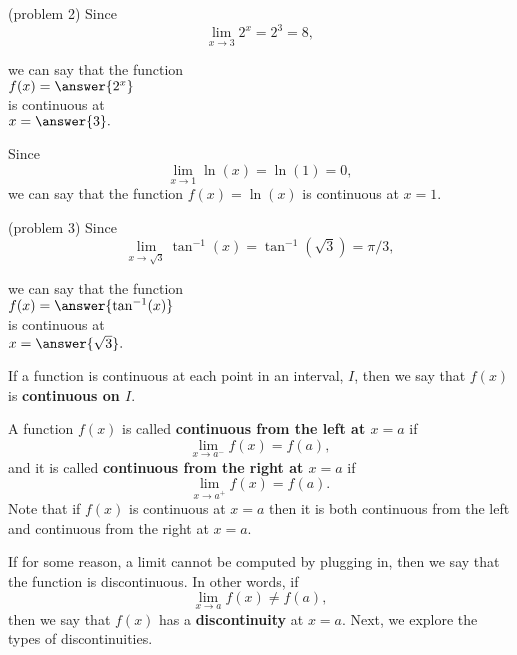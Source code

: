 \documentclass{ximera}
\begin{document}
\begin{problem}(problem 2)
Since
\[\lim_{x \to 3} 2^x = 2^3 = 8,\]
\begin{center}
we can say that the function \\
$f(x) = \answer{2^x}$ \\
is continuous at \\
$x = \answer{3}.$
\end{center}
\end{problem}

\begin{example}[example 3]
Since
\[\lim_{x \to 1} \ln(x) = \ln(1) = 0,\]
we can say that the function $f(x) = \ln(x)$ is continuous at $x = 1$.
\end{example}

\begin{problem}(problem 3)
Since
\[\lim_{x \to \sqrt 3} \tan^{-1}(x) = \tan^{-1}(\sqrt 3) = \pi/3,\]
\begin{center}
we can say that the function \\
$f(x) = \answer{\tan^{-1}(x)}$ \\
is continuous at \\
$x = \answer{\sqrt 3}.$
\end{center}
\end{problem}

If a function is continuous at each point in an interval, $I$, then we say that $f(x)$ is \textbf{continuous on $I$}.

A function $f(x)$ is called \textbf{continuous from the left at $x=a$} if 
\[\lim_{x \to a^-} f(x) = f(a),\]
and it is called \textbf{continuous from the right at $x = a$} if
\[\lim_{x \to a^+} f(x) = f(a).\]
Note that if $f(x)$ is continuous at $x=a$ then it is both continuous from the left and 
continuous from the right at $x = a$.

If for some reason, a limit cannot be computed by plugging in, then we say that the function is discontinuous.
In other words, if
\[\lim_{x \to a} f(x) \neq f(a),\]
then we say that $f(x)$ has a \textbf{discontinuity} at $x = a$.
Next, we explore the types of discontinuities.





\end{document}
